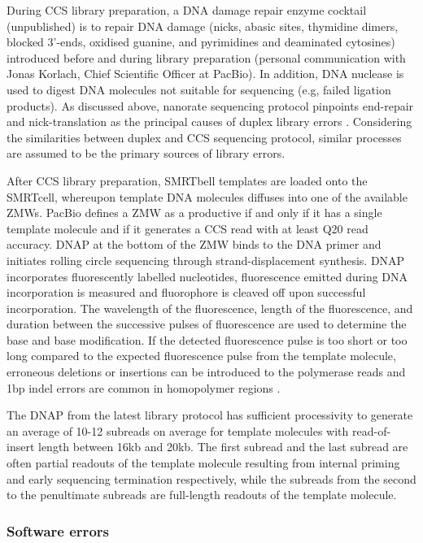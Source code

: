 During CCS library preparation, a DNA damage repair enzyme cocktail (unpublished) is to repair DNA damage (nicks, abasic sites, thymidine dimers, blocked 3’-ends, oxidised guanine, and pyrimidines and deaminated cytosines) introduced before and during library preparation (personal communication with Jonas Korlach, Chief Scientific Officer at PacBio). In addition, DNA nuclease is used to digest DNA molecules not suitable for sequencing (e.g, failed ligation products). As discussed above, nanorate sequencing protocol pinpoints end-repair and nick-translation as the principal causes of duplex library errors \cite{Abascal2021-pk}. Considering the similarities between duplex and CCS sequencing protocol, similar processes are assumed to be the primary sources of library errors.

After CCS library preparation, SMRTbell templates are loaded onto the SMRTcell, whereupon template DNA molecules diffuses into one of the available ZMWs. PacBio defines a ZMW as a productive if and only if it has a single template molecule and if it generates a CCS read with at least Q20 read accuracy. DNAP at the bottom of the ZMW binds to the DNA primer and initiates rolling circle sequencing through strand-displacement synthesis. DNAP incorporates fluorescently labelled nucleotides, fluorescence emitted during DNA incorporation is measured and fluorophore is cleaved off upon successful incorporation. The wavelength of the fluorescence, length of the fluorescence, and duration between the successive pulses of fluorescence are used to determine the base and base modification. If the detected fluorescence pulse is too short or too long compared to the expected fluorescence pulse from the template molecule, erroneous deletions or insertions can be introduced to the polymerase reads \cite{Eid2009-ol} and 1bp indel errors are common in homopolymer regions \cite{Chaisson2012-vr}. 

The DNAP from the latest library protocol has sufficient processivity to generate an average of 10-12 subreads on average for template molecules with read-of-insert length between 16kb and 20kb. The first subread and the last subread are often partial readouts of the template molecule resulting from internal priming and early sequencing termination respectively, while the subreads from the second to the penultimate subreads are full-length readouts of the template molecule.

\subsubsection{Software errors}

